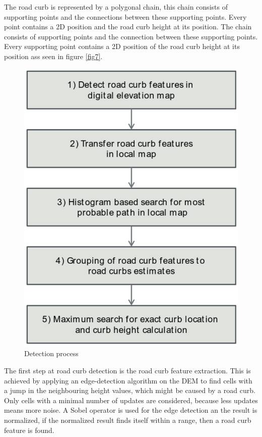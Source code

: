\documentclass[conference]{IEEEtran}
\begin{document}
The road curb is represented by a polygonal chain, this chain consists of supporting points and the connections between these supporting points. Every point contains a 2D position and the road curb height at its position. The chain consists of supporting points and the connection between these supporting points. Every supporting point contains a 2D position of the road curb height at its position ass seen in figure \ref{fig7}. 


\begin{figure}[ht]
	\centering
  	\includegraphics[scale = 0.5]{pictures/detection_process.pdf}
	\caption{Detection process}
	\label{fig8}
\end{figure}



The first step at road curb detection is the road curb feature extraction. This is achieved by applying an edge-detection algorithm on the DEM to find cells with a jump in the neighbouring height values, which might be caused by a road curb. Only cells with a minimal number of updates are considered, because less updates means more noise. A Sobel operator is used for the edge detection an the result is normalized, if the normalized result finds itself within a range, then a road curb feature is found. 
\end{document}
